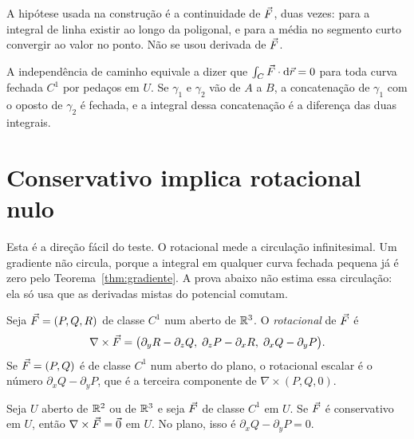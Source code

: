 \documentclass[11pt,a4paper]{article}
\begin{document}
A hipótese usada na construção é a continuidade de $\vec{F}$, duas vezes: para a integral de linha existir ao longo da poligonal, e para a média no segmento curto convergir ao valor no ponto. Não se usou derivada de $\vec{F}$.

\begin{observacao}
A independência de caminho equivale a dizer que $\int_C\vec{F}\cdot\mathrm{d}\vec{r}=0$ para toda curva fechada $C^1$ por pedaços em $U$. Se $\gamma_1$ e $\gamma_2$ vão de $A$ a $B$, a concatenação de $\gamma_1$ com o oposto de $\gamma_2$ é fechada, e a integral dessa concatenação é a diferença das duas integrais.
\end{observacao}

\section{Conservativo implica rotacional nulo}

Esta é a direção fácil do teste. O rotacional mede a circulação infinitesimal. Um gradiente não circula, porque a integral em qualquer curva fechada pequena já é zero pelo Teorema~\ref{thm:gradiente}. A prova abaixo não estima essa circulação: ela só usa que as derivadas mistas do potencial comutam.


\begin{definicao}
Seja $\vec{F}=(P,Q,R)$ de classe $C^1$ num aberto de $\mathbb{R}^3$. O \emph{rotacional} de $\vec{F}$ é
\[
\nabla\times\vec{F}
=\bigl(
\partial_y R-\partial_z Q,\;
\partial_z P-\partial_x R,\;
\partial_x Q-\partial_y P
\bigr).
\]
Se $\vec{F}=(P,Q)$ é de classe $C^1$ num aberto do plano, o rotacional escalar é o número $\partial_x Q-\partial_y P$, que é a terceira componente de $\nabla\times(P,Q,0)$.
\end{definicao}

\begin{teorema}
\label{thm:facil}
Seja $U$ aberto de $\mathbb{R}^2$ ou de $\mathbb{R}^3$ e seja $\vec{F}$ de classe $C^1$ em $U$. Se $\vec{F}$ é conservativo em $U$, então $\nabla\times\vec{F}=\vec{0}$ em $U$. No plano, isso é $\partial_x Q-\partial_y P=0$.
\end{teorema}
\end{document}
